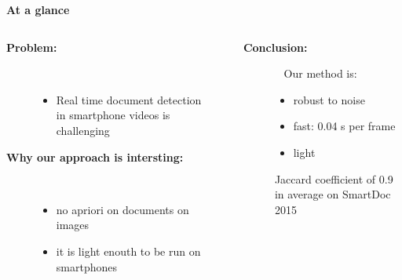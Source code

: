 \begin{exampleblock}{\bf At a glance}
     
    \vspace*{-.8em}
    \begin{columns}[t]
      \hspace*{3em}\begin{column}{0.45\textwidth}
          \begin{description}
          \item[{\bf Problem:}] ~ %
            \begin{itemize}
            \item Real time document detection in smartphone videos is challenging
            \end{itemize} \bigskip  %
          \item[{\bf Why our approach is intersting:}] ~ %
            \begin{itemize}
            \item no apriori on documents on images
            \item it is light enouth to be run on smartphones
            \end{itemize}
          \end{description}
      \end{column}
      ~
      \begin{column}{0.43\textwidth}
          \begin{description}
          \item[{\bf Conclusion:} ] ~ %
          Our method is:
            \begin{itemize}
          \item robust to noise
          \item fast: 0.04 s per frame
          \item light 
            \end{itemize}
          Jaccard coefficient of 0.9 in average on SmartDoc 2015

          \end{description}
      \end{column}
    \end{columns}
  \end{exampleblock}

